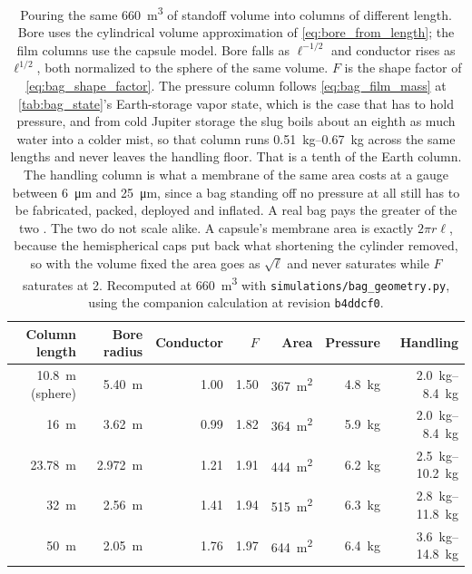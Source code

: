\documentclass{article}
\begin{document}
\begin{table}[!htpb]
    \centering
    \caption{Pouring the same \SI{660}{\cubic\meter} of standoff volume into columns of different length. Bore uses the cylindrical volume approximation of \autoref{eq:bore_from_length}; the film columns use the capsule model. Bore falls as $\ell^{-1/2}$ and conductor rises as $\ell^{1/2}$, both normalized to the sphere of the same volume. $F$ is the shape factor of \autoref{eq:bag_shape_factor}. The pressure column follows \autoref{eq:bag_film_mass} at \autoref{tab:bag_state}'s Earth-storage vapor state, which is the case that has to hold pressure, and from cold Jupiter storage the slug boils about an eighth as much water into a colder mist, so that column runs \SIrange{0.51}{0.67}{\kilogram} across the same lengths and never leaves the handling floor. That is a tenth of the Earth column. The handling column is what a membrane of the same area costs at a gauge between \SI{6}{\micro\meter} and \SI{25}{\micro\meter}, since a bag standing off no pressure at all still has to be fabricated, packed, deployed and inflated. A real bag pays the greater of the two \cite{Katz_aim_is_all_you_need_2025}. The two do not scale alike. A capsule's membrane area is exactly $2\pi r \ell$, because the hemispherical caps put back what shortening the cylinder removed, so with the volume fixed the area goes as $\sqrt{\ell}$ and never saturates while $F$ saturates at 2. Recomputed at \SI{660}{\cubic\meter} with \texttt{simulations/bag\_geometry.py}, using the companion calculation at revision \texttt{b4ddcf0}.}
    \label{tab:axial_bag}
    \begin{tabular}{|r|r|r|r|r|r|r|}\hline
        \textbf{Column length} & \textbf{Bore radius} & \textbf{Conductor} & \textbf{$F$} & \textbf{Area} & \textbf{Pressure} & \textbf{Handling} \\\hline
        \SI{10.8}{\meter} (sphere) & \SI{5.40}{\meter} & 1.00 & 1.50 & \SI{367}{\square\meter} & \SI{4.8}{\kilogram} & \SIrange{2.0}{8.4}{\kilogram} \\\hline
        \SI{16}{\meter} & \SI{3.62}{\meter} & 0.99 & 1.82 & \SI{364}{\square\meter} & \SI{5.9}{\kilogram} & \SIrange{2.0}{8.4}{\kilogram} \\\hline
        \SI{23.78}{\meter} & \SI{2.972}{\meter} & 1.21 & 1.91 & \SI{444}{\square\meter} & \SI{6.2}{\kilogram} & \SIrange{2.5}{10.2}{\kilogram} \\\hline
        \SI{32}{\meter} & \SI{2.56}{\meter} & 1.41 & 1.94 & \SI{515}{\square\meter} & \SI{6.3}{\kilogram} & \SIrange{2.8}{11.8}{\kilogram} \\\hline
        \SI{50}{\meter} & \SI{2.05}{\meter} & 1.76 & 1.97 & \SI{644}{\square\meter} & \SI{6.4}{\kilogram} & \SIrange{3.6}{14.8}{\kilogram} \\\hline
    \end{tabular}
\end{table}
\end{document}
